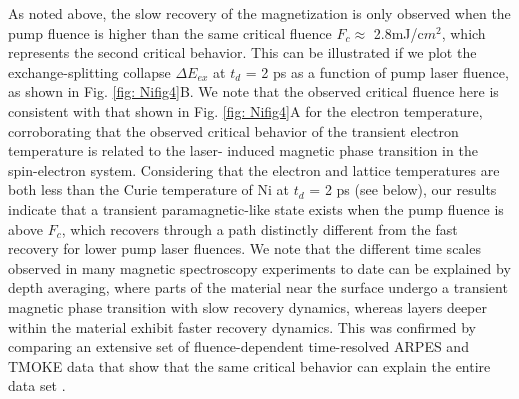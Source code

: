 As noted above, the slow recovery of the magnetization is only observed when the pump fluence is higher than the same critical fluence $F_{c} \approx$ 2.8mJ/c$m^2$, which represents the second critical behavior. This can be illustrated if we plot the exchange-splitting collapse $\Delta E_{ex}$ at $t_{d}$ = 2 ps as a function of pump laser fluence, as shown in Fig. \ref{fig: Nifig4}B. We note that the observed critical fluence here is consistent with that shown in Fig. \ref{fig: Nifig4}A for the electron temperature, corroborating that the observed critical behavior of the transient electron temperature is related to the laser- induced magnetic phase transition in the spin-electron system. Considering that the electron and lattice temperatures are both less than the Curie temperature of Ni at $t_{d}$ = 2 ps (see below), our results indicate that a transient paramagnetic-like state exists when the pump fluence is above $F_{c}$, which recovers through a path distinctly different from the fast recovery for lower pump laser fluences. We note that the different time scales observed in many magnetic spectroscopy experiments to date \cite{Koopmans2010,Roth2012} can be explained by depth averaging, where parts of the material near the surface undergo a transient magnetic phase transition with slow recovery dynamics, whereas layers deeper within the material exhibit faster recovery dynamics. This was confirmed by comparing an extensive set of fluence-dependent time-resolved ARPES and TMOKE data that show that the same critical behavior can explain the entire data set \cite{You2018}.

